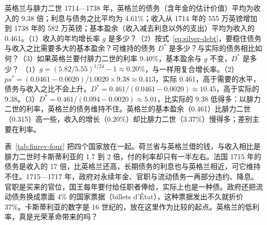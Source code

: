 \begin{example}{英格兰与腓力二世}\label{ex:finrev-debt}
1714—1738 年，英格兰的债务（含年金的估计价值）平均为收入的 9.38 倍；利息与债务之比平均为 4.61\%；收入从 1714 年的 555 万英镑增加到 1738 年的 582 万英镑；基本盈余（收入减去利息以外的支出）平均为收入的 0.461\cite{boe2017,mitchell1988}。（1）收入的年均增长率 $g$ 是多少？（2）按式~\eqref{eq:silver-debt}，要稳住债务与收入之比需要多大的基本盈余？可维持的债务 $D^{*}$ 是多少？与实际的债务相比如何？（3）如果英格兰要付腓力二世的利率 9.40\%，基本盈余与 $g$ 不变，$D^{*}$ 是多少？
\solution （1）$g=(5.82/5.55)^{1/24}-1\approx0.20\%$，与一样用复合增长率。（2）$ps^{*}=(0.0461-0.0020)/1.0020\times9.38\approx0.413$，实际 0.461，高于需要的水平，债务与收入之比不会上升。$D^{*}=0.461/(0.0461-0.0020)\approx10.45$，高于实际的 9.38。（3）$D^{*}=0.461/(0.094-0.0020)\approx5.01$，比实际的 9.38 低得多：以腓力二世的利率，英格兰的债务维持不住。英格兰的基本盈余（0.461）比腓力二世（0.315）高一些，收入的增长（0.20\%）却比腓力二世（3.37\%）慢得多；差别主要在利率。
\end{example}

表~\ref{tab:finrev-four} 把四个国家放在一起。荷兰省与英格兰借的钱，与收入相比是腓力二世时卡斯蒂利亚的 1.7 到 2 倍，付的利率却只有一半左右。法国 1715 年的债务是收入的 17 倍，比英格兰还高，长期债务的利息也与英格兰相近，可它维持不住。1715—1717 年，政府对永续年金、官职与流动债务一再部分违约、降息。官职是买来的官位，国王每年要付给任职者俸给，实际上也是一种债。政府还把流动债务换成票面 4\% 的国家票据（billets d’État），这种票据发出不久就折价 37\%\cite{velde2003}。卡斯蒂利亚的数字是 16 世纪的，放在这里作为比较的起点。英格兰的低利率，真是光荣革命带来的吗？

